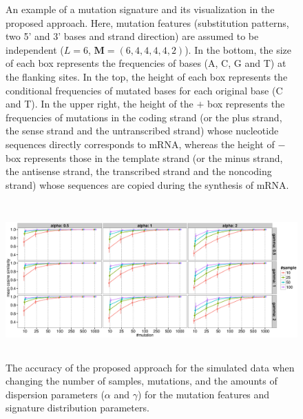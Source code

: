 \begin{figure}
\begin{minipage}{0.4\textwidth}
\begin{flushleft}
\end{flushleft}
\end{minipage}
\caption{An example of a mutation signature and its visualization in the proposed approach.
Here, mutation features (substitution patterns, two 5' and 3' bases and strand direction) 
are assumed to be independent ($L=6$, $\bm{M} = (6, 4, 4, 4, 4, 2)$).
In the bottom, the size of each box represents the frequencies of bases (A, C, G and T) at the flanking sites.
In the top, the height of each box represents the conditional frequencies of mutated bases for each original base (C and T).
In the upper right, the height of the $+$ box represents the frequencies of mutations in the coding strand (or the plus strand, the sense strand and the untranscribed strand)
whose nucleotide sequences directly corresponds to mRNA, 
whereas the height of $-$ box represents those in the template strand (or the minus strand, the antisense strand, the transcribed strand and the noncoding strand)
whose sequences are copied during the synthesis of mRNA.
}
\label{mutSig_example}

\end{figure}


\clearpage

\begin{figure}[b]
\centering
\includegraphics[width=16cm,height=6cm]{simulation_result.eps}
\caption{The accuracy of the proposed approach for the simulated data 
when changing the number of samples, mutations, 
and the amounts of dispersion parameters ($\alpha$ and $\gamma$) for the mutation features and signature distribution parameters.
}
\label{sim_facet}
\end{figure}



